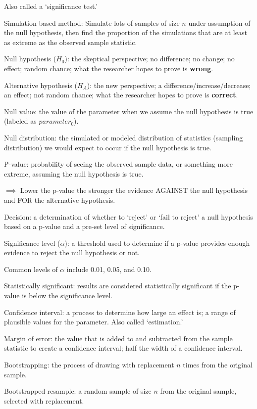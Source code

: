 \documentclass[
]{report}
\newcommand{\rgi}{\hspace{24pt}}  %
\begin{document}
\rgi Also called a `significance test.'

Simulation-based method: Simulate lots of samples of size \(n\) under assumption of the null hypothesis, then find the proportion of the simulations that are at least as extreme as the observed sample statistic.

Null hypothesis (\(H_0\)): the skeptical perspective; no difference; no change; no effect; random chance; what the researcher hopes to prove is \textbf{wrong}.

Alternative hypothesis (\(H_A\)): the new perspective; a difference/increase/decrease; an effect; not random chance; what the researcher hopes to prove is \textbf{correct}.

Null value: the value of the parameter when we assume the null hypothesis is true (labeled as \(parameter_0\)).

Null distribution: the simulated or modeled distribution of statistics (sampling distribution) we would expect to occur if the null hypothesis is true.

P-value: probability of seeing the observed sample data, or something more extreme, assuming the null hypothesis is true.

\(\implies\) Lower the p-value the stronger the evidence AGAINST the null hypothesis and FOR the alternative hypothesis.

Decision: a determination of whether to `reject' or `fail to reject' a null hypothesis based on a p-value and a pre-set level of significance.

Significance level (\(\alpha\)): a threshold used to determine if a p-value provides enough evidence to reject the null hypothesis or not.

\rgi Common levels of \(\alpha\) include 0.01, 0.05, and 0.10.

Statistically significant: results are considered statistically significant if the p-value is below the significance level.

Confidence interval: a process to determine how large an effect is; a range of plausible values for the parameter. Also called `estimation.'

Margin of error: the value that is added to and subtracted from the sample statistic to create a confidence interval; half the width of a confidence interval.

Bootstrapping: the process of drawing with replacement \(n\) times from the original sample.

Bootstrapped resample: a random sample of size \(n\) from the original sample, selected with replacement.
\end{document}
